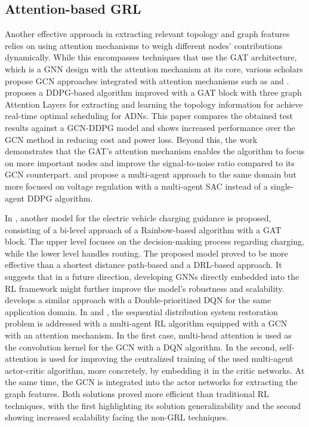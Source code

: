\subsection{Attention-based GRL}
Another effective approach in extracting relevant topology and graph features relies on using attention mechanisms to weigh different nodes' contributions dynamically. While this encompasses techniques that use the \ac{GAT} architecture, which is a \ac{GNN} design with the attention mechanism at its core, various scholars propose \ac{GCN} approaches integrated with attention mechanisms such as \cite{zhaoLearningSequentialDistribution2022} and \cite{fanAttentionBasedMultiAgentGraph2023}.
\cite{xingRealtimeOptimalScheduling2023} proposes a \ac{DDPG}-based algorithm improved with a \ac{GAT} block with three graph Attention Layers for extracting and learning the topology information for achieve real-time optimal scheduling for \acp{ADN}. This paper compares the obtained test results against a \ac{GCN}-\ac{DDPG} model and shows increased performance over the \ac{GCN} method in reducing cost and power loss. Beyond this, the work demonstrates that the \ac{GAT}'s attention mechanism enables the algorithm to focus on more important nodes and improve the signal-to-noise ratio compared to its \ac{GCN} counterpart. \cite{chenPhysicalassistedMultiagentGraph2023} and propose a multi-agent approach to the same domain but more focused on voltage regulation with a multi-agent \ac{SAC} instead of a single-agent \ac{DDPG} algorithm. \par
In \cite{xingBilevelGraphReinforcement2023}, another model for the electric vehicle charging guidance is proposed, consisting of a bi-level approach of a Rainbow-based algorithm with a \ac{GAT} block. The upper level focuses on the decision-making process regarding charging, while the lower level handles routing. The proposed model proved to be more effective than a shortest distance path-based \cite{xingModellingDrivingCharging2021} and a \ac{DRL}-based \cite{qianDeepReinforcementLearning2020} approach. It suggests that in a future direction, developing \acp{GNN} directly embedded into the \ac{RL} framework might further improve the model's robustness and scalability. \cite{xuRealtimeFastCharging2022} develops a similar approach with a Double-prioritized DQN for the same application domain.
In \cite{zhaoLearningSequentialDistribution2022} and \cite{fanAttentionBasedMultiAgentGraph2023}, the sequential distribution system restoration problem is addressed with a multi-agent \ac{RL} algorithm equipped with a \ac{GCN} with an attention mechanism. In the first case, multi-head attention is used as the convolution kernel for the \ac{GCN} with a \ac{DQN} algorithm. In the second, self-attention is used for improving the centralized training of the used multi-agent actor-critic algorithm, more concretely, by embedding it in the critic networks. At the same time, the \ac{GCN} is integrated into the actor networks for extracting the graph features. Both solutions proved more efficient than traditional \ac{RL} techniques, with the first highlighting its solution generalizability and the second showing increased scalability facing the non-GRL techniques.


